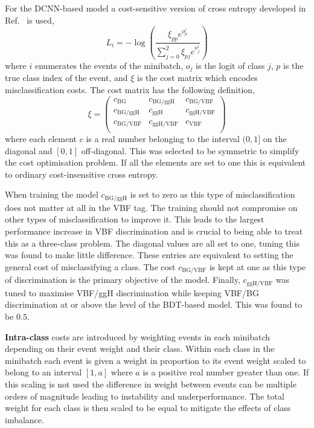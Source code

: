 For the DCNN-based model a cost-sensitive version of cross entropy developed in Ref.~\cite{CostSensitivity} is used,
\begin{equation}
    L_i = -\log\left(\frac{\xi_{pp}e^{o^{i}_{p}}}{\sum_{j=0}^{2}\xi_{pj}e^{o^{i}_{j}}}\right)
\end{equation} 
where $i$ enumerates the events of the minibatch, $o_j$ is the logit of class $j$, $p$ is the true class index of the event, and $\xi$ is the cost matrix which encodes misclassification costs.
The cost matrix has the following definition,
\begin{equation}
    \xi = \begin{pmatrix}
        c_{\mathrm{BG}} & c_{\mathrm{BG}/\mathrm{ggH}} & c_{\mathrm{BG}/\mathrm{VBF}} \\
        c_{\mathrm{BG}/\mathrm{ggH}} & c_{\mathrm{ggH}} & c_{\mathrm{ggH}/\mathrm{VBF}} \\
        c_{\mathrm{BG}/\mathrm{VBF}} & c_{\mathrm{ggH}/\mathrm{VBF}} & c_{\mathrm{VBF}} \\
    \end{pmatrix}
\end{equation}
where each element $c$ is a real number belonging to the interval $(0,1]$ on the diagonal and $[0,1]$ off-diagonal. 
This was selected to be symmetric to simplify the cost optimisation problem.
If all the elements are set to one this is equivalent to ordinary cost-insensitive cross entropy. 

When training the model $c_{\mathrm{BG}/\mathrm{ggH}}$ is set to zero as this type of misclassification does not matter at all in the VBF tag. 
The training should not compromise on other types of misclassification to improve it. 
This leads to the largest performance increase in VBF discrimination and is crucial to being able to treat this as a three-class problem.
The diagonal values are all set to one, tuning this was found to make little difference. These entries are equivalent to setting the general cost of misclassifying a class.
The cost $c_{\mathrm{BG}/\mathrm{VBF}}$ is kept at one as this type of discrimination is the primary objective of the model. 
Finally, $c_{\mathrm{ggH}/\mathrm{VBF}}$ was tuned to maximise VBF/ggH discrimination while keeping VBF/BG discrimination at or above the level of the BDT-based model. This was found to be $0.5$.

\textbf{Intra-class} costs are introduced by weighting events in each minibatch depending on their event weight and their class.  
Within each class in the minibatch each event is given a weight in proportion to its event weight scaled to belong to an interval $[1,a]$ where $a$ is a positive real number greater than one. 
If this scaling is not used the difference in weight between events can be multiple orders of magnitude leading to instability and underperformance. 
The total weight for each class is then scaled to be equal to mitigate the effects of class imbalance. 

